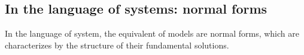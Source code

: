 \subsection{In the language of systems: normal forms}
In the language of system, the equivalent of models are normal forms, which are
characterizes by the structure of their fundamental solutions.

\begin{comment}
  If we start with a connection matrix $A\in G(\!\{t\}\!)$, we can bring it into
  \PROBLEM-normal form using formal transformations\PROBLEM[not defined yet].
  I.e.\ it becomes a block diagonal matrix of blocks, of the form
  \[
    \begin{pmatrix}
      f(t) & 1 & 0 \dots
    \\0 & f(t) & 1 & 0 \dots
    \\ & 0 &\ddots & \ddots
    \\ & & \ddots
    \end{pmatrix}
  \]
  The $f$ can be written as $\phi(t)\in t\C(\!\{t\}\!)$\PROBLEM[$\in t\C(t)$?]
  and $\alpha$ such that $f(t)=\phi(t)+\alpha$. Thus the block decomposes into
  \[
    \begin{pmatrix}
      f(t) & 1 & 0 \dots
    \\0 & f(t) & 1 & 0 \dots
    \\ & 0 &\ddots & \ddots
    \\ & & \ddots
    \end{pmatrix}
    =
    \begin{pmatrix}
      \phi(t) & 0 \dots
    \\0 & \phi(t) & 0 \dots
    \\ & 0 &\ddots & \ddots
    \\ & & \ddots
    \end{pmatrix}
    +
    \begin{pmatrix}
      \alpha & 1 & 0 \dots
    \\0 & \alpha & 1 & 0 \dots
    \\ & 0 &\ddots & \ddots
    \\ & & \ddots
    \end{pmatrix}
  \]
\end{comment}

